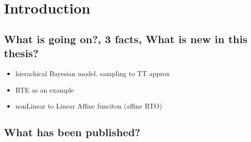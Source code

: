 \chapter{Introduction}

\section{What is going on?, 3 facts, What is new in this thesis?}
\begin{itemize}
	\item hierachical Bayesian model, sampling to TT approx
	\item RTE as an example
	\item nonLinear to Linear Affine funciton (affine RTO)
\end{itemize}
\section{What has been published?}

%
%
%


